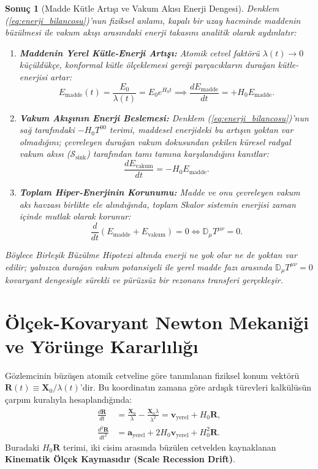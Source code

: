 \documentclass[11pt,a4paper]{article}
\newtheorem{corollary}{Sonuç}[theorem]
\begin{document}
\begin{corollary}[Madde Kütle Artışı ve Vakum Akısı Enerji Dengesi]
    \label{cor:madde_vakum_enerji_dengesi_sc}
    Denklem (\ref{eq:enerji_bilancosu})'nun fiziksel anlamı, kapalı bir uzay hacminde maddenin büzülmesi ile vakum akışı arasındaki enerji takasını analitik olarak aydınlatır:
    \begin{enumerate}
        \item \textbf{Maddenin Yerel Kütle-Enerji Artışı:} Atomik cetvel faktörü $\lambda(t) \to 0$ küçüldükçe, konformal kütle ölçeklemesi gereği parçacıkların durağan kütle-enerjisi artar:
              $$E_{\mathrm{madde}}(t) = \frac{E_0}{\lambda(t)} = E_0 e^{H_0 t} \implies \frac{d E_{\mathrm{madde}}}{dt} = + H_0 E_{\mathrm{madde}}.$$
        \item \textbf{Vakum Akışının Enerji Beslemesi:} Denklem (\ref{eq:enerji_bilancosu})'nun sağ tarafındaki $-H_0 T^{00}$ terimi, maddesel enerjideki bu artışın yoktan var olmadığını; çevreleyen durağan vakum dokusundan çekilen küresel radyal vakum akısı ($\mathcal{S}_{\mathrm{sink}}$) tarafından tamı tamına karşılandığını kanıtlar:
              $$\frac{d E_{\mathrm{vakum}}}{dt} = - H_0 E_{\mathrm{madde}}.$$
        \item \textbf{Toplam Hiper-Enerjinin Korunumu:} Madde ve onu çevreleyen vakum akı havzası birlikte ele alındığında, toplam Skalor sistemin enerjisi zaman içinde mutlak olarak korunur:
              \begin{equation}
                  \frac{d}{dt} \left( E_{\mathrm{madde}} + E_{\mathrm{vakum}} \right) = 0 \iff \mathbb{D}_\mu T^{\mu\nu} = 0.
              \end{equation}
    \end{enumerate}
    Böylece Birleşik Büzülme Hipotezi altında enerji ne yok olur ne de yoktan var edilir; yalnızca durağan vakum potansiyeli ile yerel madde fazı arasında $\mathbb{D}_\mu T^{\mu\nu} = 0$ kovaryant dengesiyle sürekli ve pürüzsüz bir rezonans transferi gerçekleşir.
\end{corollary}

\section{Ölçek-Kovaryant Newton Mekaniği ve Yörünge Kararlılığı}
\label{sec:newton_mekanigi}

Gözlemcinin büzüşen atomik cetveline göre tanımlanan fiziksel konum vektörü $\mathbf{R}(t) \equiv \mathbf{X}_0 / \lambda(t)$'dir. Bu koordinatın zamana göre ardışık türevleri kalkülüsün çarpım kuralıyla hesaplandığında:
\begin{align}
    \frac{d\mathbf{R}}{dt}     & = \frac{\dot{\mathbf{X}}_0}{\lambda} - \frac{\mathbf{X}_0 \dot{\lambda}}{\lambda^2} = \mathbf{v}_{\mathrm{yerel}} + H_0 \mathbf{R}, \label{eq:olcek_hiz} \\
    \frac{d^2\mathbf{R}}{dt^2} & = \mathbf{a}_{\mathrm{yerel}} + 2 H_0 \mathbf{v}_{\mathrm{yerel}} + H_0^2 \mathbf{R}. \label{eq:olcek_ivme}
\end{align}
Buradaki $H_0 \mathbf{R}$ terimi, iki cisim arasında büzülen cetvelden kaynaklanan \textbf{Kinematik Ölçek Kaymasıdır (Scale Recession Drift)}.
\end{document}

